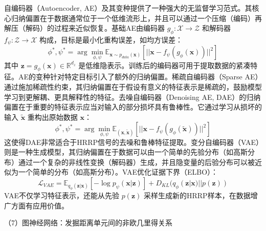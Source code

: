 自编码器（Autoencoder, AE）及其变种提供了一种强大的无监督学习范式。其核心归纳偏置在于数据通常位于一个低维流形上，并且可以通过一个压缩（编码）再解压（解码）的过程来近似恢复。基础AE由编码器 $g_\phi: \mathcal{X} \rightarrow \mathcal{Z}$ 和解码器 $f_\psi: \mathcal{Z} \rightarrow \mathcal{X}$ 构成，目标是最小化重构误差，如均方误差：
\begin{equation}
    \phi^*, \psi^* = \arg\min_{\phi, \psi} \mathbb{E}_{\mathbf{x} \sim p_{data}(\mathbf{x})} [ ||\mathbf{x} - f_\psi(g_\phi(\mathbf{x}))||^2 ]
    \label{eq:ae_objective_mse_revised}
\end{equation}
其中 $\mathbf{z} = g_\phi(\mathbf{x}) \in \mathbb{R}^{d_z}$ 是低维隐表示。训练后的编码器可用于提取数据的紧凑特征。AE的变种针对特定目标引入了额外的归纳偏置。稀疏自编码器（Sparse AE）通过施加稀疏性约束，其归纳偏置在于假设有意义的特征表示是稀疏的，鼓励模型学习到更解耦、更具解释性的特征。去噪自编码器（Denoising AE, DAE）的归纳偏置在于重要的特征表示应当对输入的部分损坏具有鲁棒性。它通过学习从损坏的输入 $\tilde{\mathbf{x}}$ 重构出原始数据 $\mathbf{x}$：
\begin{equation}
    \phi^*, \psi^* = \arg\min_{\phi, \psi} \mathbb{E}_{(\mathbf{x}, \tilde{\mathbf{x}})} [ ||\mathbf{x} - f_\psi(g_\phi(\tilde{\mathbf{x}}))||^2 ]
    \label{eq:dae_objective_revised}
\end{equation}
这使得DAE非常适合于HRRP信号的去噪和鲁棒特征提取。变分自编码器（VAE）则是一种生成模型，其归纳偏置在于数据可以由一个简单的先验分布（如高斯分布）通过一个复杂的非线性变换（解码器）生成，并且隐变量的后验分布可以被近似为一个简单的分布（如高斯分布）。VAE优化证据下界（ELBO）：
\begin{equation}
    \mathcal{L}_{VAE} = \mathbb{E}_{q_\phi(\mathbf{z}|\mathbf{x})}[-\log p_\psi(\mathbf{x}|\mathbf{z})] + D_{KL}(q_\phi(\mathbf{z}|\mathbf{x}) || p(\mathbf{z}))
    \label{eq:vae_objective_revised}
\end{equation}
VAE不仅学习特征表示，还能从先验 $p(\mathbf{z})$ 采样生成新的HRRP样本，在数据增广方面有应用价值。

（7）图神经网络：发掘距离单元间的非欧几里得关系

